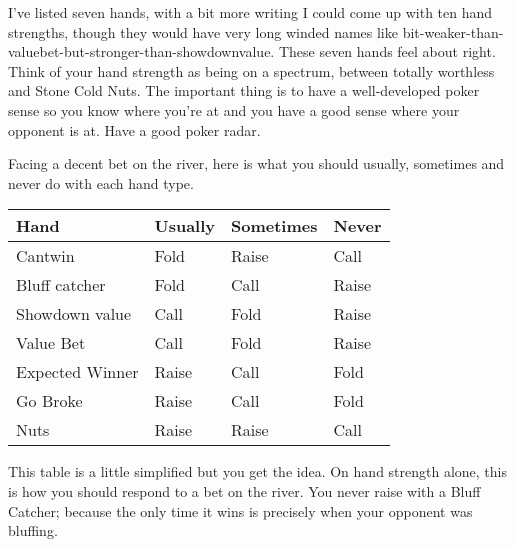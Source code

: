 
I've listed seven hands, with a bit more writing
I could come up with ten hand strengths, though they would have
very long winded names like
bit-weaker-than-valuebet-but-stronger-than-showdownvalue. These
seven hands feel about right. Think of
your hand strength as being on a spectrum, between totally
worthless and Stone Cold Nuts. The important thing is to have
a well-developed poker sense so you know where you're at and you
have a good sense where your opponent is at. Have a good poker radar.

Facing a decent bet on the river, here is what you should
usually, sometimes and never do with each hand type.

\begin{tabular}{|l|l|l|l|} \hline
Hand    &  Usually & Sometimes & Never \\ \hline
Cantwin & Fold  & Raise     & Call  \\ \hline
Bluff catcher  & Fold & Call & Raise \\ \hline
Showdown value & Call & Fold & Raise \\ \hline
Value Bet & Call & Fold & Raise \\ \hline
Expected Winner & Raise & Call & Fold \\ \hline
Go Broke & Raise & Call & Fold \\ \hline
Nuts     & Raise & Raise & Call \\ \hline
\end{tabular}

This table is a little simplified but you get the idea. On hand strength
alone, this is how you should respond to a bet on the river. You never
raise with a Bluff Catcher; because the only time it wins is precisely
when your opponent was bluffing.
